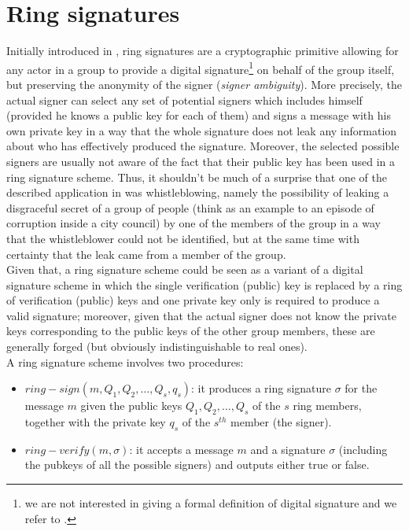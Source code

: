 \section{Ring signatures}
Initially introduced in \cite{LeakSecret}, ring signatures are a cryptographic primitive allowing for any actor in a group to provide a digital signature\footnote{we are not interested in giving a formal definition of digital signature and we refer to \cite{UnderstandingCrypto}.} on behalf of the group itself, but preserving the anonymity of the signer (\textit{signer ambiguity}). More precisely, the actual signer can select any set of potential signers which includes himself (provided he knows a public key for each of them) and signs a message with his own private key in a way that the whole signature does not leak any information about who has effectively produced the signature. Moreover, the selected possible signers are usually not aware of the fact that their public key has been used in a ring signature scheme. Thus, it shouldn't be much of a surprise that one of the described application in \cite{LeakSecret} was whistleblowing, namely the possibility of leaking a disgraceful secret of a group of people (think as an example to an episode of corruption inside a city council) by one of the members of the group in a way that the whistleblower could not be identified, but at the same time with certainty that the leak came from a member of the group.\\
Given that, a ring signature scheme could be seen as a variant of a digital signature scheme in which the single verification (public) key is replaced by a ring of verification (public) keys and one private key only is required to produce a valid signature; moreover, given that the actual signer does not know the private keys corresponding to the public keys of the other group members, these are generally forged (but obviously indistinguishable to real ones).\\
A ring signature scheme involves two procedures: \begin{itemize}
    \item $ring-sign(m, Q_1, Q_2, \dots, Q_s, q_s)$: it produces a ring signature $\sigma$ for the message $m$ given the public keys $Q_1, Q_2, \dots, Q_s$ of the $s$ ring members, together with the private key $q_s$ of the $s^{th}$ member (the signer).
    \item $ring-verify(m,\sigma)$: it accepts a message $m$ and a signature $\sigma$ (including the pubkeys of all the possible signers) and outputs either true or false.
\end{itemize}
